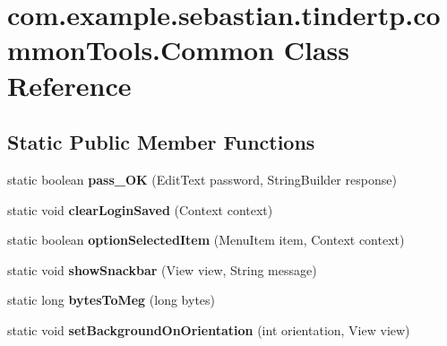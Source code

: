 \hypertarget{classcom_1_1example_1_1sebastian_1_1tindertp_1_1commonTools_1_1Common}{}\section{com.\+example.\+sebastian.\+tindertp.\+common\+Tools.\+Common Class Reference}
\label{classcom_1_1example_1_1sebastian_1_1tindertp_1_1commonTools_1_1Common}
\subsection*{Static Public Member Functions}
\begin{DoxyCompactItemize}
\item 
static boolean {\bfseries pass\+\_\+\+OK} (Edit\+Text password, String\+Builder response)\hypertarget{classcom_1_1example_1_1sebastian_1_1tindertp_1_1commonTools_1_1Common_aa8a00a26fec3015d703474c715548ceb}{}\label{classcom_1_1example_1_1sebastian_1_1tindertp_1_1commonTools_1_1Common_aa8a00a26fec3015d703474c715548ceb}

\item 
static void {\bfseries clear\+Login\+Saved} (Context context)\hypertarget{classcom_1_1example_1_1sebastian_1_1tindertp_1_1commonTools_1_1Common_a602f78b647b4c1617a2173a9d94d97a1}{}\label{classcom_1_1example_1_1sebastian_1_1tindertp_1_1commonTools_1_1Common_a602f78b647b4c1617a2173a9d94d97a1}

\item 
static boolean {\bfseries option\+Selected\+Item} (Menu\+Item item, Context context)\hypertarget{classcom_1_1example_1_1sebastian_1_1tindertp_1_1commonTools_1_1Common_ad5a698303b87f0930ce1f129d87e22c2}{}\label{classcom_1_1example_1_1sebastian_1_1tindertp_1_1commonTools_1_1Common_ad5a698303b87f0930ce1f129d87e22c2}

\item 
static void {\bfseries show\+Snackbar} (View view, String message)\hypertarget{classcom_1_1example_1_1sebastian_1_1tindertp_1_1commonTools_1_1Common_af59bc9ff042336c3d62c4bc55bd45499}{}\label{classcom_1_1example_1_1sebastian_1_1tindertp_1_1commonTools_1_1Common_af59bc9ff042336c3d62c4bc55bd45499}

\item 
static long {\bfseries bytes\+To\+Meg} (long bytes)\hypertarget{classcom_1_1example_1_1sebastian_1_1tindertp_1_1commonTools_1_1Common_aedc85af8b31ee8f5ef82a63055bcb1bd}{}\label{classcom_1_1example_1_1sebastian_1_1tindertp_1_1commonTools_1_1Common_aedc85af8b31ee8f5ef82a63055bcb1bd}

\item 
static void {\bfseries set\+Background\+On\+Orientation} (int orientation, View view)\hypertarget{classcom_1_1example_1_1sebastian_1_1tindertp_1_1commonTools_1_1Common_a651c566f8bddcd50c6dd01e648f86913}{}\label{classcom_1_1example_1_1sebastian_1_1tindertp_1_1commonTools_1_1Common_a651c566f8bddcd50c6dd01e648f86913}

\end{DoxyCompactItemize}
